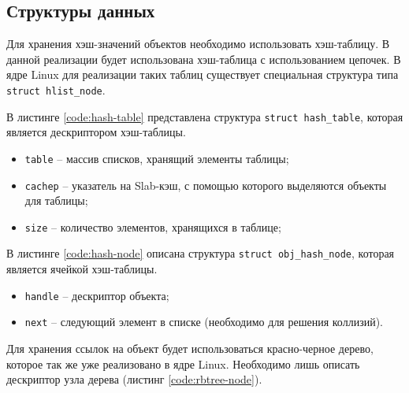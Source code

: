\subsection{Структуры данных}

Для хранения хэш-значений объектов необходимо использовать хэш-таблицу. В данной реализации будет использована хэш-таблица с использованием цепочек. В ядре Linux для реализации таких таблиц существует специальная структура типа \texttt{struct hlist\_node}.

В листинге \ref{code:hash-table} представлена структура \texttt{struct hash\_table}, которая является дескриптором хэш-таблицы.


\begin{itemize}
	\item \texttt{table} -- массив списков, хранящий элементы таблицы;
	\item \texttt{cachep} -- указатель на Slab-кэш, с помощью которого выделяются объекты для таблицы;
	\item \texttt{size} -- количество элементов, хранящихся в таблице;
\end{itemize}

\pagebreak

В листинге \ref{code:hash-node} описана структура \texttt{struct obj\_hash\_node}, которая является ячейкой хэш-таблицы.


\begin{itemize}
	\item \texttt{handle} -- дескриптор объекта;
	\item \texttt{next} -- следующий элемент в списке (необходимо для решения коллизий).
\end{itemize}

Для хранения ссылок на объект будет использоваться красно-черное дерево, которое так же уже реализовано в ядре Linux. Необходимо лишь описать дескриптор узла дерева (листинг \ref{code:rbtree-node}).

